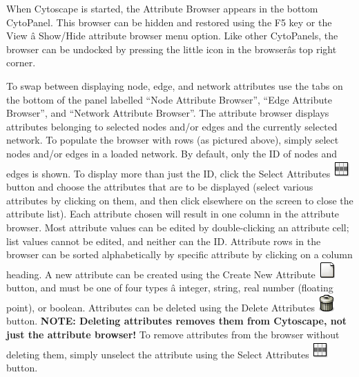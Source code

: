  When Cytoscape is started, the Attribute Browser appears in the bottom CytoPanel. This browser can be hidden and restored using the F5 key or the View \^a Show/Hide attribute browser menu option. Like other CytoPanels, the browser can be undocked by pressing the little icon in the browser\^as top right corner. 


 To swap between displaying node, edge, and network attributes use the tabs on the bottom of the panel labelled ``Node Attribute Browser'', ``Edge Attribute Browser'', and ``Network Attribute Browser''. The attribute browser displays attributes belonging to selected nodes and/or edges and the currently selected network. To populate the browser with rows (as pictured above), simply select nodes and/or edges in a loaded network. By default, only the ID of nodes and edges is shown. To display more than just the ID, click the Select Attributes \includegraphics[scale=1]{images/attributes_select_icon.png}  button and choose the attributes that are to be displayed (select various attributes by clicking on them, and then click elsewhere on the screen to close the attribute list). Each attribute chosen will result in one column in the attribute browser. Most attribute values can be edited by double-clicking an attribute cell; list values cannot be edited, and neither can the ID. Attribute rows in the browser can be sorted alphabetically by specific attribute by clicking on a column heading. A new attribute can be created using the Create New Attribute \includegraphics[scale=1]{images/attributes_new_icon.png}  button, and must be one of four types \^a integer, string, real number (floating point), or boolean. Attributes can be deleted using the Delete Attributes \includegraphics[scale=1]{images/attributes_delete_icon.png}  button. \textbf{NOTE: Deleting attributes removes them from Cytoscape, not just the attribute browser!}
 To remove attributes from the browser without deleting them, simply unselect the attribute using the Select Attributes \includegraphics[scale=1]{images/attributes_select_icon.png}  button. 


